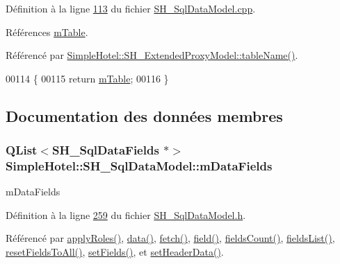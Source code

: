 Définition à la ligne \hyperlink{SH__SqlDataModel_8cpp_source_l00113}{113} du fichier \hyperlink{SH__SqlDataModel_8cpp_source}{S\-H\-\_\-\-Sql\-Data\-Model.\-cpp}.



Références \hyperlink{classSimpleHotel_1_1SH__SqlDataModel_a567dcf9f5f9088ef90238d86272b3121}{m\-Table}.



Référencé par \hyperlink{classSimpleHotel_1_1SH__ExtendedProxyModel_a49617ea8bab745425beec3dbd3fddba7}{Simple\-Hotel\-::\-S\-H\-\_\-\-Extended\-Proxy\-Model\-::table\-Name()}.


\begin{DoxyCode}
00114 \{
00115     \textcolor{keywordflow}{return} \hyperlink{classSimpleHotel_1_1SH__SqlDataModel_a567dcf9f5f9088ef90238d86272b3121}{mTable};
00116 \}
\end{DoxyCode}


\subsection{Documentation des données membres}
\hypertarget{classSimpleHotel_1_1SH__SqlDataModel_aa583366a8960adea9a0719a63fa03a24}{
\subsubsection[{m\-Data\-Fields}]{\setlength{\rightskip}{0pt plus 5cm}Q\-List$<${\bf S\-H\-\_\-\-Sql\-Data\-Fields} $\ast$$>$ Simple\-Hotel\-::\-S\-H\-\_\-\-Sql\-Data\-Model\-::m\-Data\-Fields\hspace{0.3cm}{\ttfamily [private]}}}\label{classSimpleHotel_1_1SH__SqlDataModel_aa583366a8960adea9a0719a63fa03a24}


m\-Data\-Fields 



Définition à la ligne \hyperlink{SH__SqlDataModel_8h_source_l00259}{259} du fichier \hyperlink{SH__SqlDataModel_8h_source}{S\-H\-\_\-\-Sql\-Data\-Model.\-h}.



Référencé par \hyperlink{classSimpleHotel_1_1SH__SqlDataModel_a8de3952fd015f7ef4f8f079cb729306d}{apply\-Roles()}, \hyperlink{classSimpleHotel_1_1SH__SqlDataModel_a6874d8547f590990f5aab80976ec7c6e}{data()}, \hyperlink{classSimpleHotel_1_1SH__SqlDataModel_ab8b74a08f668025c11c5446d4e4b469b}{fetch()}, \hyperlink{classSimpleHotel_1_1SH__SqlDataModel_a19ff52676ebed5ac65be5e0fe9d51171}{field()}, \hyperlink{classSimpleHotel_1_1SH__SqlDataModel_a17632bfd3246d95554d3642089c3828b}{fields\-Count()}, \hyperlink{classSimpleHotel_1_1SH__SqlDataModel_a9210c286bfe24038478c48cbdf42d144}{fields\-List()}, \hyperlink{classSimpleHotel_1_1SH__SqlDataModel_aa27ed72a82ba857af52d0f9665768fc0}{reset\-Fields\-To\-All()}, \hyperlink{classSimpleHotel_1_1SH__SqlDataModel_a70bdb5d69f0709cdea2c17f257089f91}{set\-Fields()}, et \hyperlink{classSimpleHotel_1_1SH__SqlDataModel_af0af2d450bd8de03a7c62f7cd6514610}{set\-Header\-Data()}.

